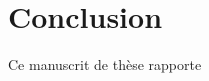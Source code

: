 \documentclass[a4paper,11pt,twoside]{StyleThese}
\begin{document}
\fi


\chapter*{Conclusion}
Ce manuscrit de thèse rapporte 

\ifdefined{}
\else


\end{document}
